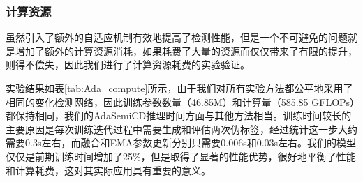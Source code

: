 \documentclass[lang=chs, degree=master, blindreview=false, adobe=false]{yanputhesis}
\begin{document}
\subsubsection{计算资源}
虽然引入了额外的自适应机制有效地提高了检测性能，但是一个不可避免的问题就是增加了额外的计算资源消耗，如果耗费了大量的资源而仅仅带来了有限的提升，则得不偿失，因此我们进行了计算资源耗费的实验验证。

实验结果如表\ref{tab:Ada_compute}所示，由于我们对所有实验方法都公平地采用了相同的变化检测网络，因此训练参数数量（46.85M）和计算量（585.85 GFLOPs）都保持相同，我们的AdaSemiCD推理时间方面与其他方法相当。训练时间较长的主要原因是每次训练迭代过程中需要生成和评估两次伪标签，经过统计这一步大约需要0.3s左右，而融合和EMA参数更新分别只需要0.006s和0.03s左右。我们的模型仅仅是前期训练时间增加了25$\%$，但是取得了显著的性能优势，很好地平衡了性能和计算耗费，这对其实际应用具有重要的意义。
\end{document}
